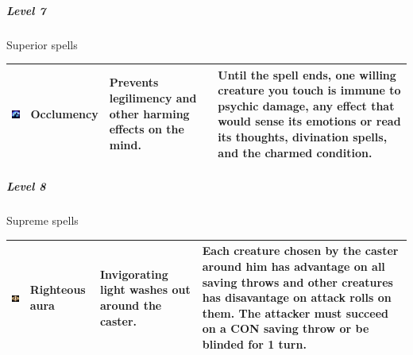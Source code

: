 \subparagraph{Level 7} 
Superior spells \\
\begin{tabular}{ m{2cm}m{3cm}m{4cm}m{6cm} } \hline
	\includegraphics[width=2cm]{../Pictures/Gameplay/Spells/Icon/Occlumency_spell_icon.png} & \textbf{Occlumency} & Prevents legilimency and other harming effects on the mind. & Until the spell ends, one willing creature you touch is immune to psychic damage, any effect that would sense its emotions or read its thoughts, divination spells, and the charmed condition. \\ \hline
\end{tabular}

\subparagraph{Level 8} 
Supreme spells \\
\begin{tabular}{ m{2cm}m{3cm}m{4cm}m{6cm} } \hline
	\includegraphics[width=2cm]{../Pictures/Gameplay/Spells/Icon/Righteous_aura_spell_icon.png} & \textbf{Righteous aura} & Invigorating light washes out around the caster. & Each creature chosen by the caster around him has advantage on all saving throws and other creatures has disavantage on attack rolls on them. The attacker must succeed on a CON saving throw or be blinded for 1 turn. \\ \hline
\end{tabular}

\pagebreak













